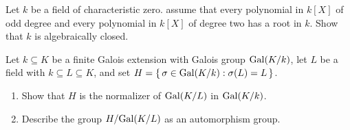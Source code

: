 \begin{problem}
  Let $k$ be a field of characteristic zero. assume that every polynomial
  in $k[X]$ of odd degree and every polynomial in $k[X]$ of degree two has
  a root in $k$. Show that $k$ is algebraically closed.
\end{problem}
\begin{solution}
\end{solution}

\begin{problem}
  Let $k\subseteq K$ be a finite Galois extension with Galois group
  $\operatorname{Gal}(K/k)$, let $L$ be a field with $ k\subseteq L\subseteq K$, and set
  $H=\left\{\,\sigma\in\operatorname{Gal}(K/k):\sigma(L)=L\,\right\}$.
  \begin{enumerate}[label=(\alph*),noitemsep]
  \item Show that $H$ is the normalizer of $\operatorname{Gal}(K/L)$ in $\operatorname{Gal}(K/k)$.
  \item Describe the group $H/{\operatorname{Gal}(K/L)}$ as an automorphism group.
  \end{enumerate}
\end{problem}
\begin{solution}
\end{solution}

